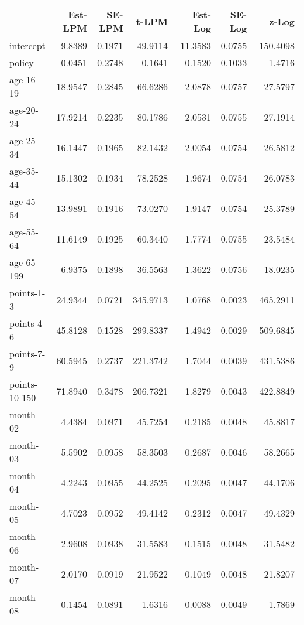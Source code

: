 \documentclass[10pt]{article}
\begin{document}

\begin{table}[ht]
\centering
\begin{tabular}{lrrrrrr}
  \hline
 & Est-LPM & SE-LPM & t-LPM & Est-Log & SE-Log & z-Log \\ 
  \hline
intercept & -9.8389 & 0.1971 & -49.9114 & -11.3583 & 0.0755 & -150.4098 \\ 
  policy & -0.0451 & 0.2748 & -0.1641 & 0.1520 & 0.1033 & 1.4716 \\ 
  age-16-19 & 18.9547 & 0.2845 & 66.6286 & 2.0878 & 0.0757 & 27.5797 \\ 
  age-20-24 & 17.9214 & 0.2235 & 80.1786 & 2.0531 & 0.0755 & 27.1914 \\ 
  age-25-34 & 16.1447 & 0.1965 & 82.1432 & 2.0054 & 0.0754 & 26.5812 \\ 
  age-35-44 & 15.1302 & 0.1934 & 78.2528 & 1.9674 & 0.0754 & 26.0783 \\ 
  age-45-54 & 13.9891 & 0.1916 & 73.0270 & 1.9147 & 0.0754 & 25.3789 \\ 
  age-55-64 & 11.6149 & 0.1925 & 60.3440 & 1.7774 & 0.0755 & 23.5484 \\ 
  age-65-199 & 6.9375 & 0.1898 & 36.5563 & 1.3622 & 0.0756 & 18.0235 \\ 
  points-1-3 & 24.9344 & 0.0721 & 345.9713 & 1.0768 & 0.0023 & 465.2911 \\ 
  points-4-6 & 45.8128 & 0.1528 & 299.8337 & 1.4942 & 0.0029 & 509.6845 \\ 
  points-7-9 & 60.5945 & 0.2737 & 221.3742 & 1.7044 & 0.0039 & 431.5386 \\ 
  points-10-150 & 71.8940 & 0.3478 & 206.7321 & 1.8279 & 0.0043 & 422.8849 \\ 
  month-02 & 4.4384 & 0.0971 & 45.7254 & 0.2185 & 0.0048 & 45.8817 \\ 
  month-03 & 5.5902 & 0.0958 & 58.3503 & 0.2687 & 0.0046 & 58.2665 \\ 
  month-04 & 4.2243 & 0.0955 & 44.2525 & 0.2095 & 0.0047 & 44.1706 \\ 
  month-05 & 4.7023 & 0.0952 & 49.4142 & 0.2312 & 0.0047 & 49.4329 \\ 
  month-06 & 2.9608 & 0.0938 & 31.5583 & 0.1515 & 0.0048 & 31.5482 \\ 
  month-07 & 2.0170 & 0.0919 & 21.9522 & 0.1049 & 0.0048 & 21.8207 \\ 
  month-08 & -0.1454 & 0.0891 & -1.6316 & -0.0088 & 0.0049 & -1.7869 \\ 

\end{tabular}
\end{table}
\end{document}
